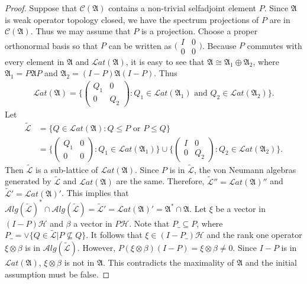 \documentclass[a4paper,10pt]{amsart}
\theoremstyle{refs}
\newcommand{\AAA}{\mathfrak A}
\newcommand{\CCC}{\mathcal C}
\newcommand{\HHH}{\mathcal H} %
\newcommand{\LLL}{\mathcal L} %
\newcommand{\Lat}{\mathcal Lat}
\newcommand{\Alg}{\mathcal Alg}
\begin{document}
\begin{proof}
Suppose that $\CCC(\AAA)$ contains a non-trivial selfadjoint element
$P$. Since $\AAA$
is weak operator topology closed, we have
the spectrum projections of $P$ are in $\CCC(\AAA)$. Thus we may
assume that $P$ is a projection. Choose a proper orthonormal
basis so that $P$ can be written as
$\bigl(\begin{smallmatrix}
           I & 0 \\
           0 & 0
           \end{smallmatrix} \bigr)$. Because $P$
           commutes with every element in
$\AAA$ and $\Lat(\AAA)$, it is easy to see that $\AAA \cong
\AAA_1 \oplus \AAA_2$, where
$\AAA_1 = P\AAA P$ and $\AAA_2 = (I-P)\AAA(I-P)$.
Thus
\begin{align*}
\Lat(\AAA) = \{\left(\begin{array}{cc}Q_1 & 0 \\
                                      0 & Q_2\end{array}\right) : Q_1 \in
\Lat(\AAA_1) \mbox{ and } Q_2 \in \Lat(\AAA_2)\}.
\end{align*}
Let
\begin{align*}
    \widetilde{\LLL} &= \{Q \in \Lat( \AAA ) : Q \leq P \mbox{ or } P
\leq Q \} \\
& =  \{\left(\begin{array}{cc}Q_1 & 0 \\
                                      0 & 0 \end{array}\right) : Q_1 \in
\Lat(\AAA_1)\} \cup
 \{\left(\begin{array}{cc} I & 0 \\
                          0 & Q_{2} \end{array}\right) : Q_2 \in \Lat(\AAA_2)\} .
\end{align*}
 Then $\widetilde{\LLL}$ is a sub-lattice of
$\Lat(\AAA )$. Since $P$ is in $\widetilde{\LLL}$,
the von Neumann algebras generated by $\widetilde{\LLL}$ and
$\Lat(\AAA)$ are the same. Therefore, $\widetilde{\LLL}'' = \Lat(\AAA)''$
and $\widetilde{\LLL}' = \Lat(\AAA)'$.
This implies
that $\Alg(\widetilde{\LLL})^{*} \cap \Alg(\widetilde{\LLL})
= \widetilde{\LLL}' = \Lat( \AAA )' = \AAA^{*} \cap
\AAA$. Let $\xi$ be a vector in $(I - P) \HHH$ and
$\beta$ a vector in $P \HHH$. Note that
$P\_ \subseteq P$,
where $P\_ = \vee \{Q \in \widetilde{\LLL} | P \nsubseteq Q\}$.
It follows that $\xi \in (I-P\_)\HHH$ and
the rank one operator $\xi \otimes \beta$ is in $\Alg(\widetilde{\LLL})$.
However, $P (\xi \otimes \beta) (I-P) = \xi \otimes \beta \neq 0$.
Since $I-P$ is in $\Lat(\AAA)$, $\xi \otimes \beta$ is not in $\AAA$.
This contradicts the maximality of $\AAA$ and the
initial assumption must be false.
\end{proof}
\end{document}
